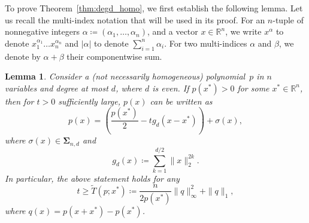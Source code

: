 \documentclass[12pt]{article}
\newcommand{\reals}{\mathbb{R}}
\newcommand{\SOS}{\mathbf{\Sigma}}
\newcommand{\defeq}{\coloneq}
\newtheorem{lemma}[theorem]{Lemma}  %
\theoremstyle{remark}
\begin{document}
To prove Theorem~\ref{thm:degd_homo}, we first establish the following lemma. 
Let us recall the multi-index notation that will be used in its proof. For an $n$-tuple of nonnegative integers $\alpha\defeq(\alpha_1,\ldots,\alpha_n)$, and a vector $x\in\reals^n$, we write $x^{\alpha}$ to denote $x_1^{\alpha_1}\ldots x_n^{\alpha_n}$ and $|\alpha|$ to denote $\sum_{i=1}^n \alpha_i$. For two multi-indices $\alpha$ and $\beta$, we denote by $\alpha+\beta$ their componentwise sum.  



\begin{lemma}\label{thm:degd_nonhomo}
Consider a (not necessarily homogeneous) polynomial~$p$ in $n$ variables and degree at most $d$, where $d$ is even. If $p(x^*)>0$ for some $x^*\in\reals^n$, then for $t>0$ sufficiently large, $p(x)$ can be written as
\[p(x)=\left(\frac{p(x^*)}{2}-tg_d(x-x^*)\right)+\sigma(x),\]
where $\sigma(x)\in\SOS_{n,d}$ and 
\begin{equation}\label{eq:degd_nonhomo_g}
  g_d(x)\defeq\sum_{k=1}^{d/2}\|x\|_2^{2k}.  
\end{equation}
In particular, the above statement holds for any 
\[t\ge \tilde{T}(p;x^*)\defeq\dfrac{n}{2p(x^*)}\|q\|^2_{\infty} + \|q\|_1,\]
where $q(x)=p(x+x^*)-p(x^*)$. 
\end{lemma}
\end{document}
